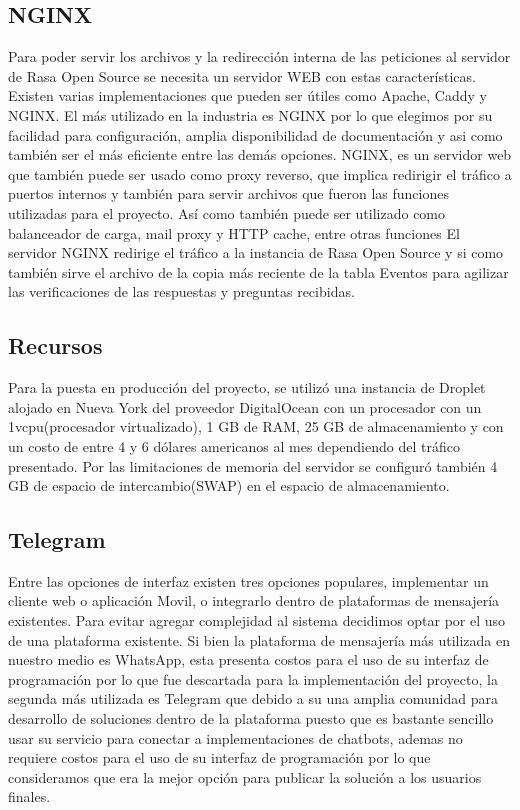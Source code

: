 \subsection{NGINX}
Para poder servir los archivos y la redirección interna de  las peticiones al servidor de Rasa Open
Source se necesita un servidor WEB con estas características. Existen  varias implementaciones que
pueden ser útiles como Apache, Caddy y NGINX. El más utilizado en la industria es NGINX por lo que
elegimos por su facilidad para configuración, amplia disponibilidad de documentación y asi como
también ser el más eficiente entre las demás opciones. \cite{web_servers}
NGINX, es un servidor web que también puede ser usado como proxy reverso, que implica redirigir el
tráfico a puertos internos y también para servir archivos que fueron las funciones utilizadas para
el proyecto. Así como también puede ser utilizado como balanceador de carga, mail proxy y HTTP
cache, entre otras funciones \cite{NGINX}
El servidor NGINX redirige el tráfico a la instancia de Rasa Open Source y si como también sirve el
archivo de
la copia más reciente de la tabla Eventos para agilizar las verificaciones de las respuestas y
preguntas recibidas.
\subsection{Recursos}
Para la puesta en producción del proyecto, se utilizó una instancia de Droplet alojado en Nueva
York del proveedor DigitalOcean con un procesador con un 1vcpu(procesador virtualizado), 1 GB de
RAM, 25 GB de almacenamiento y con un costo de entre 4 y 6 dólares americanos al mes dependiendo
del tráfico presentado. Por las limitaciones de memoria del servidor se configuró también 4 GB de
espacio de intercambio(SWAP) en el espacio de almacenamiento.


\subsection{Telegram}
Entre las opciones de interfaz existen tres opciones populares, implementar un cliente web o
aplicación Movil, o integrarlo dentro de plataformas de mensajería existentes. Para evitar agregar
complejidad al sistema decidimos optar por el uso de una plataforma existente. Si bien la plataforma
de mensajería más utilizada en nuestro medio es WhatsApp, esta presenta
costos para el uso de su interfaz de programación por lo que fue descartada para la implementación del
proyecto, la segunda más utilizada es Telegram que debido a su una amplia comunidad
para desarrollo de soluciones dentro de la plataforma puesto que es bastante sencillo
usar su servicio para conectar a implementaciones de chatbots, ademas no requiere costos para el
uso de su interfaz de programación por lo que consideramos que era la mejor opción para
publicar la solución a los usuarios finales.
\cite{botfather}

